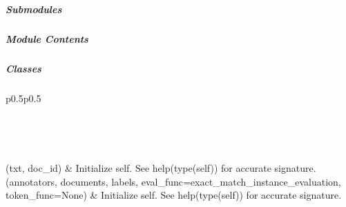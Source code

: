 \documentclass[letterpaper,10pt,english]{sphinxmanual}
\begin{document}
\subparagraph{}
\label{\detokenize{autoapi/pine/backend/pineiaa/bratiaa/index:module-pine.backend.pineiaa.bratiaa}}\label{\detokenize{autoapi/pine/backend/pineiaa/bratiaa/index:pine-backend-pineiaa-bratiaa}}\label{\detokenize{autoapi/pine/backend/pineiaa/bratiaa/index::doc}}

\subparagraph{Submodules}
\label{\detokenize{autoapi/pine/backend/pineiaa/bratiaa/index:submodules}}

\subparagraph{}
\label{\detokenize{autoapi/pine/backend/pineiaa/bratiaa/agree/index:module-pine.backend.pineiaa.bratiaa.agree}}\label{\detokenize{autoapi/pine/backend/pineiaa/bratiaa/agree/index:pine-backend-pineiaa-bratiaa-agree}}\label{\detokenize{autoapi/pine/backend/pineiaa/bratiaa/agree/index::doc}}

\subparagraph{Module Contents}
\label{\detokenize{autoapi/pine/backend/pineiaa/bratiaa/agree/index:module-contents}}

\subparagraph{Classes}
\label{\detokenize{autoapi/pine/backend/pineiaa/bratiaa/agree/index:classes}}

\begin{savenotes}\sphinxatlongtablestart\begin{longtable}[c]{p{0.5\linewidth}p{0.5\linewidth}}
\hline

\endfirsthead

%
{}\\
\hline

\endhead

\hline
{}\\
\endfoot

\endlastfoot

{\hyperref[\detokenize{autoapi/pine/backend/pineiaa/bratiaa/agree/index:pine.backend.pineiaa.bratiaa.agree.Document}]{}}(txt, doc\_id)
&
Initialize self.  See help(type(self)) for accurate signature.
\\
\hline
{\hyperref[\detokenize{autoapi/pine/backend/pineiaa/bratiaa/agree/index:pine.backend.pineiaa.bratiaa.agree.F1Agreement}]{}}(annotators, documents, labels, eval\_func=exact\_match\_instance\_evaluation, token\_func=None)
&
Initialize self.  See help(type(self)) for accurate signature.
\\
\hline
\end{longtable}\sphinxatlongtableend\end{savenotes}
\end{document}
